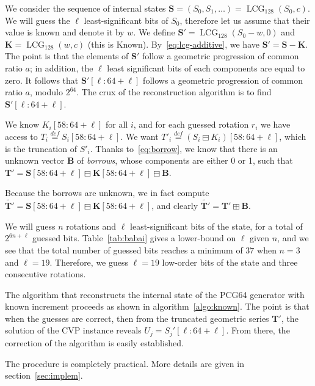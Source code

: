 \documentclass[submission,svgnames,journal=tosc]{iacrtrans}
\DeclareMathOperator{\LCG}{LCG}
\begin{document}
We consider the sequence of internal states
$\mathbf{S} = (S_0, S_1, \dots) = \LCG_{128}(S_0, c)$. We will guess the $\ell$
least-significant bits of $S_0$, therefore let us assume that their value is
known and denote it by $w$. We define $\mathbf{S}' = \LCG_{128}(S_0 - w, 0)$ and
$\mathbf{K} = \LCG_{128}(w, c)$ (this is Known). By~\eqref{eq:lcg-additive}, we
have $\mathbf{S}' = \mathbf{S} - \mathbf{K}$. The point is that the elements of
$\mathbf{S}'$ follow a geometric progression of common ratio $a$; in addition,
the $\ell$ least significant bits of each components are equal to zero. It
follows that $\mathbf{S}'[\ell:64+\ell]$ follows a geometric progression of
common ratio $a$, modulo $2^{64}$. The crux of the reconstruction algorithm is
to find $\mathbf{S}'[\ell:64+\ell]$.

We know $K_i[58:64+\ell]$ for all $i$, and for each guessed rotation $r_i$ we
have access to $T_i \stackrel{def}{=} S_i[58:64+\ell]$.  We want
$T'_i \stackrel{def}{=} (S_i \boxminus K_i)[58:64+\ell]$, which is the
truncation of $S'_i$. Thanks to~\eqref{eq:borrow}, we know that there is an
unknown vector $\mathbf{B}$ of \emph{borrows}, whose components are either 0 or
1, such that
$\mathbf{T'} = \mathbf{S}[58:64+\ell] \boxminus \mathbf{K}[58:64+\ell] \boxminus
\mathbf{B}$.

Because the borrows are unknown, we in fact compute
$\widetilde{\mathbf{T}'} = \mathbf{S}[58:64+\ell] \boxminus
\mathbf{K}[58:64+\ell]$, and clearly
$\widetilde{\mathbf{T}'} = \mathbf{T}' \boxplus \mathbf{B}$.

We will guess $n$ rotations and $\ell$ least-significant bits of the state, for
a total of $2^{6n + \ell}$ guessed bits. Table~\ref{tab:babai} gives a
lower-bound on $\ell$ given $n$, and we see that the total number of guessed
bits reaches a minimum of $37$ when $n=3$ and $\ell=19$. Therefore, we guess
$\ell = 19$ low-order bits of the state and three consecutive rotations.

The algorithm that reconstructs the internal state of the \textsf{PCG64}
generator with known increment proceeds as shown in
algorithm~\ref{algo:known}. The point is that when the guesses are correct, then
from the truncated geometric series $\mathbf{T'}$, the solution of the CVP
instance reveals $U_j = S_j'[\ell:64+\ell]$. From there, the correction of the
algorithm is easily established.

The procedure is completely practical. More details are given in section~\ref{sec:implem}.
\end{document}
